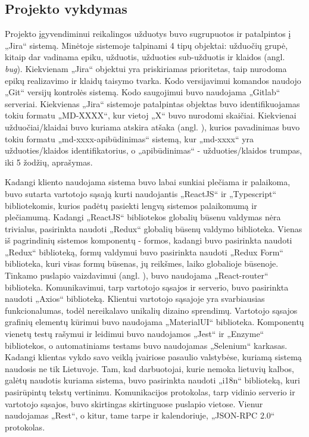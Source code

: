 \documentclass{VUMIFPSbakalaurinis}
\begin{document}
\subsection{Projekto vykdymas}

Projekto įgyvendiminui reikalingos užduotys buvo sugrupuotos ir patalpintos į „Jira“ sistemą. Minėtoje sistemoje talpinami 4 tipų objektai: užduočių grupė, kitaip dar vadinama epiku, užduotis, užduoties sub-užduotis ir klaidos (angl. \textit{bug}). Kiekvienam „Jira“ objektui yra priskiriamas prioritetas, taip nurodoma epikų realizavimo ir klaidų taisymo tvarka. Kodo versijavimui komandos naudojo „Git“ versijų kontrolės sistemą. Kodo saugojimui buvo naudojama „Gitlab“ serveriai. Kiekvienas „Jira“ sistemoje patalpintas objektas buvo identifikuojamas tokiu formatu „MD-XXXX“, kur vietoj „X“ buvo nurodomi skaičiai. Kiekvienai užduočiai/klaidai buvo kuriama atskira atšaka (angl. ), kurios pavadinimas buvo tokiu formatu „md-xxxx-apibūdinimas“ sistemą, kur „md-xxxx“ yra užduoties/klaidos identifikatorius, o „apibūdinimas“ - užduoties/klaidos trumpas, iki 5 žodžių, aprašymas.

Kadangi kliento naudojama sistema buvo labai sunkiai plečiama ir palaikoma, buvo sutarta vartotojo sąsają kurti naudojantis „ReactJS“ ir „Typescript“ bibliotekomis, kurios padėtų pasiekti lengvą sistemos palaikomumą ir plečiamumą. Kadangi „ReactJS“ bibliotekos globalių būsenu valdymas nėra trivialus, pasirinkta naudoti „Redux“ globalių būsenų valdymo biblioteka. Vienas iš pagrindinių sistemos komponentų - formos, kadangi buvo pasirinkta naudoti „Redux“ biblioteką, formų valdymui buvo pasirinkta naudoti „Redux Form“ biblioteka, kuri visas formų būsenas, jų reikšmes, laiko globalioje būsenoje. Tinkamo puslapio vaizdavimui (angl. ), buvo naudojama „React-router“ biblioteka. Komunikavimui, tarp vartotojo sąsajos ir serverio, buvo pasirinkta naudoti „Axios“ biblioteką. Klientui vartotojo sąsajoje yra svarbiausias funkcionalumas, todėl nereikalavo unikalių dizaino sprendimų. Vartotojo sąsajos grafinių elementų kūrimui buvo naudojama „MaterialUI“ biblioteka. Komponentų vienetų testų rašymui ir leidimui buvo naudojamos „Jest“ ir „Enzyme“ bibliotekos, o automatiniams testams buvo naudojamas „Selenium“ karkasas. Kadangi klientas vykdo savo veiklą įvairiose pasaulio valstybėse, kuriamą sistemą naudosis ne tik Lietuvoje. Tam, kad darbuotojai, kurie nemoka lietuvių kalbos, galėtų naudotis kuriama sistema, buvo pasirinkta naudoti „i18n“ biblioteką, kuri pasirūpintų tekstų vertinimu. Komunikacijos protokolas, tarp vidinio serverio ir vartotojo sąsajos, buvo skirtingas skirtinguose puslapio vietose. Vienur naudojamas „Rest“, o kitur, tame tarpe ir kalendoriuje, „JSON-RPC 2.0“ protokolas.
\end{document}
